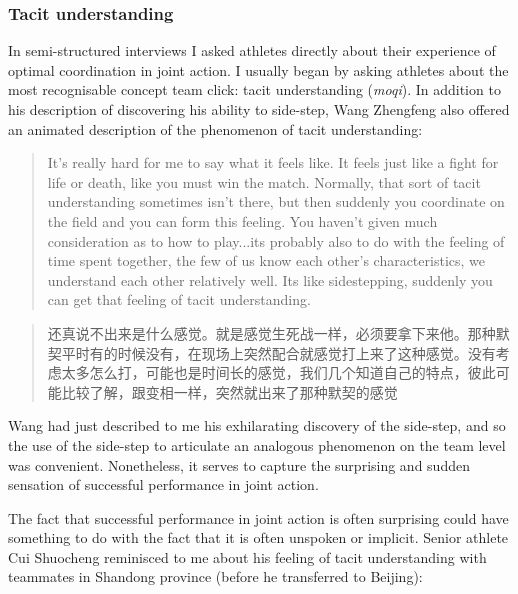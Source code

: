 \begin{CJK}{UTF8}{gbsn}
\subsubsection{Tacit understanding}
In semi-structured interviews I asked athletes directly about their experience of optimal coordination in joint action.  I usually began by asking athletes about the most recognisable concept team click: tacit understanding (\textit{moqi}).  In addition to his description of discovering his ability to side-step, Wang Zhengfeng also offered an animated description of the phenomenon of tacit understanding:

  \begin{quote}
    It’s really hard for me to say what it feels like.  It feels just like a fight for life or death, like you must win the match.  Normally, that sort of tacit understanding sometimes isn’t there, but then suddenly you coordinate on the field and you can form this feeling.  You haven't given much consideration as to how to play...its probably also to do with the feeling of time spent together, the few of us know each other’s characteristics, we understand each other relatively well.  Its like sidestepping, suddenly you can get that feeling of tacit understanding.
  \end{quote}

  \begin{quote}
    还真说不出来是什么感觉。就是感觉生死战一样，必须要拿下来他。那种默契平时有的时候没有，在现场上突然配合就感觉打上来了这种感觉。没有考虑太多怎么打，可能也是时间长的感觉，我们几个知道自己的特点，彼此可能比较了解，跟变相一样，突然就出来了那种默契的感觉 
  \end{quote}

Wang had just described to me his exhilarating discovery of the side-step, and so the use of the side-step to articulate an analogous phenomenon on the team level was convenient.  Nonetheless, it serves to capture the surprising and sudden sensation of successful performance in joint action.

The fact that successful performance in joint action is often surprising could have something to do with the fact that it is often unspoken or implicit.  Senior athlete Cui Shuocheng reminisced to me about his feeling of tacit understanding with teammates in Shandong province (before he transferred to Beijing):


\end{CJK}
